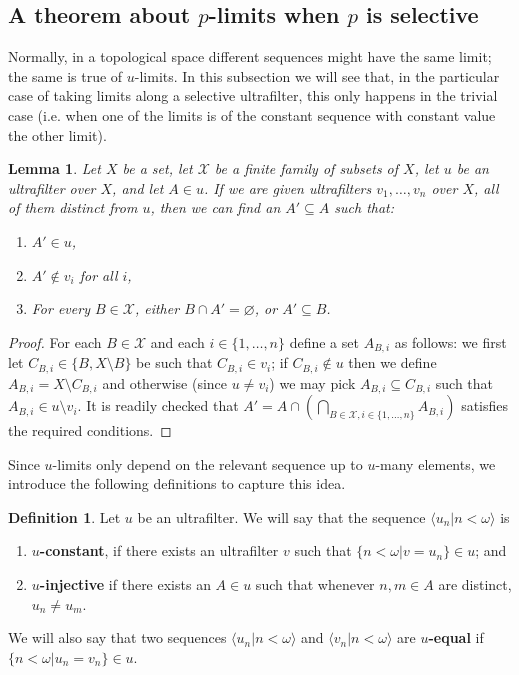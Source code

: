\documentclass[10pt]{amsart}
\newtheorem{lemma}[theorem]{Lemma}
\theoremstyle{definition}
\newtheorem{definition}[theorem]{Definition}
\theoremstyle{remark}
\begin{document}
\subsection{A theorem about $p$-limits when $p$ is selective}

Normally, in a topological space different sequences might have the same limit; the same is true of $u$-limits. In this subsection we will see that, in the particular case of taking limits along a selective ultrafilter, this only happens in the trivial case (i.e. when one of the limits is of the constant sequence with constant value the other limit).

\begin{lemma}\label{lem:combinations}
Let $X$ be a set, let $\mathscr X$ be a finite family of subsets of $X$, let $u$ be an ultrafilter over $X$, and let $A\in u$. If we are given ultrafilters $v_1,\ldots,v_n$ over $X$, all of them distinct from $u$, then we can find an $A'\subseteq A$ such that:
\begin{enumerate}
\item $A'\in u$,
\item $A'\notin v_i$ for all $i$,
\item For every $B\in\mathscr X$, either $B\cap A'=\varnothing$, or $A'\subseteq B$.
\end{enumerate}
\end{lemma}

\begin{proof}
For each $B\in\mathscr X$ and each $i\in\{1,\ldots,n\}$ define a set $A_{B,i}$ as follows:  we first let $C_{B,i}\in\{B,X\setminus B\}$ be such that $C_{B,i}\in v_i$; if $C_{B,i}\notin u$ then we define $A_{B,i}=X\setminus C_{B,i}$ and otherwise (since $u\neq v_i$) we may pick $A_{B,i}\subseteq C_{B,i}$ such that $A_{B,i}\in u\setminus v_i$. It is readily checked that $\displaystyle{A'=A\cap\left(\bigcap_{B\in\mathscr X,i\in\{1,\ldots,n\}}A_{B,i}\right)}$ satisfies the required conditions.
\end{proof}

Since $u$-limits only depend on the relevant sequence up to $u$-many elements, we introduce the following definitions to capture this idea.

\begin{definition}\label{def:modulou}
Let $u$ be an ultrafilter. We will say that the sequence $\langle u_n\big|n<\omega\rangle$ is
\begin{enumerate}
    \item {\bf $u$-constant}, if there exists an ultrafilter $v$ such that $\{n<\omega\big|v=u_n\}\in u$; and
    \item {\bf $u$-injective} if there exists an $A\in u$ such that whenever $n,m\in A$ are distinct, $u_n\neq u_m$.
\end{enumerate}
We will also say that two sequences $\langle u_n\big|n<\omega\rangle$ and $\langle v_n\big|n<\omega\rangle$ are {\bf $u$-equal} if $\{n<\omega\big|u_n=v_n\}\in u$.
\end{definition}
\end{document}
